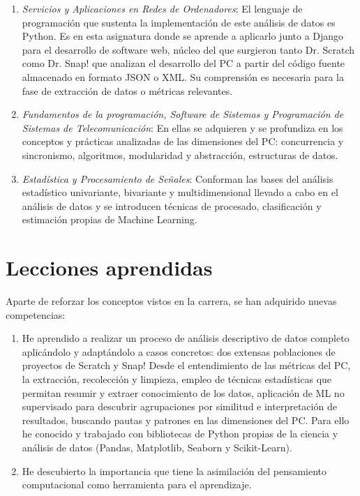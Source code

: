 \documentclass[a4paper, 12pt]{book}
\begin{document}
\begin{enumerate}
    \item \emph{Servicios y Aplicaciones en Redes de Ordenadores}: El lenguaje de programación que sustenta la implementación de este análisis de datos es Python. Es en esta asignatura donde se aprende a aplicarlo junto a Django para el desarrollo de software web, núcleo del que surgieron tanto Dr. Scratch como Dr. Snap! que analizan el desarrollo del PC a partir del código fuente almacenado en formato JSON o XML. Su comprensión es necesaria para la fase de extracción de datos o métricas relevantes.
    \item \emph{Fundamentos de la programación, Software de Sistemas y Programación de Sistemas de Telecomunicación}: En ellas se adquieren y se profundiza en los conceptos y prácticas analizadas de las dimensiones del PC: concurrencia y sincronismo, algoritmos, modularidad y abstracción, estructuras de datos.  
    \item \emph{Estadística y Procesamiento de Señales}: Conforman las bases del análisis estadístico univariante, bivariante y multidimensional llevado a cabo en el análisis de datos y se introducen técnicas de procesado, clasificación y estimación propias de Machine Learning.
\end{enumerate}

\section{Lecciones aprendidas}
\label{sec:lecciones_aprendidas}

Aparte de reforzar los conceptos vistos en la carrera, se han adquirido nuevas competencias:

\begin{enumerate}
    \item He aprendido a realizar un proceso de análisis descriptivo de datos completo aplicándolo y adaptándolo a casos concretos: dos extensas poblaciones de proyectos de Scratch y Snap! Desde el entendimiento de las métricas del PC, la extracción, recolección y limpieza, empleo de técnicas estadísticas que permitan resumir y extraer conocimiento de los datos, aplicación de ML no supervisado para descubrir agrupaciones por similitud e interpretación de resultados, buscando pautas y patrones en las dimensiones del PC. Para ello he conocido y trabajado con bibliotecas de Python propias de la ciencia y análisis de datos (Pandas, Matplotlib, Seaborn y Scikit-Learn).
    \item He descubierto la importancia que tiene la asimilación del pensamiento computacional como herramienta para el aprendizaje.
\end{enumerate}
\end{document}
